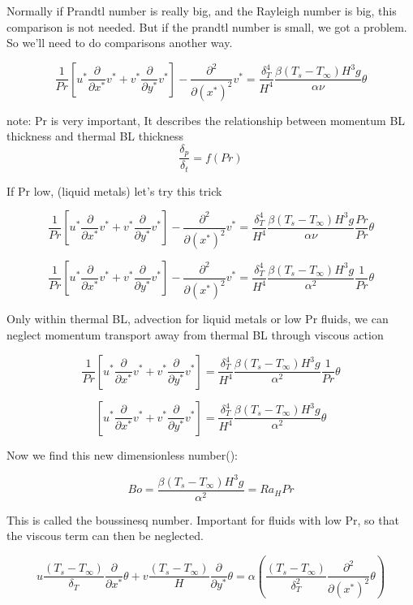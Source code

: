 \documentclass[11pt]{article}
\begin{document}
Normally if Prandtl number is really big, and the Rayleigh number is big, this comparison is not needed. But if the prandtl number is small, we got a problem. So we'll need to do comparisons another way.


$$ \frac{1}{Pr} \left[ u^* \frac{\partial}{\partial x^*} v^* +    v^* \frac{\partial}{\partial y^*} v^* \right] -   \frac{\partial^2}{\partial (x^*)^2} v^*  = \frac{\delta_T^4}{ H^4} \frac{\beta(T_s-T_\infty) H^3 g}{\alpha \nu}  \theta $$


note: Pr is very important,
It describes the relationship between momentum BL thickness and thermal BL thickness
$$\frac{\delta_p}{\delta_t} = f(Pr)$$

If Pr low, (liquid metals)
let's try this trick

$$ \frac{1}{Pr} \left[ u^* \frac{\partial}{\partial x^*} v^* +    v^* \frac{\partial}{\partial y^*} v^* \right] -   \frac{\partial^2}{\partial (x^*)^2} v^*  = \frac{\delta_T^4}{ H^4} \frac{\beta(T_s-T_\infty) H^3 g}{\alpha \nu}  \frac{Pr}{Pr} \theta $$


$$ \frac{1}{Pr} \left[ u^* \frac{\partial}{\partial x^*} v^* +    v^* \frac{\partial}{\partial y^*} v^* \right] -   \frac{\partial^2}{\partial (x^*)^2} v^*  = \frac{\delta_T^4}{ H^4} \frac{\beta(T_s-T_\infty) H^3 g}{\alpha^2}  \frac{1}{Pr} \theta $$

Only within thermal BL, advection for liquid metals or low Pr fluids, we can neglect momentum transport away from thermal BL through viscous action

$$ \frac{1}{Pr} \left[ u^* \frac{\partial}{\partial x^*} v^* +    v^* \frac{\partial}{\partial y^*} v^* \right]  = \frac{\delta_T^4}{ H^4} \frac{\beta(T_s-T_\infty) H^3 g}{\alpha^2}  \frac{1}{Pr} \theta $$

$$ \left[ u^* \frac{\partial}{\partial x^*} v^* +    v^* \frac{\partial}{\partial y^*} v^* \right]  = \frac{\delta_T^4}{ H^4} \frac{\beta(T_s-T_\infty) H^3 g}{\alpha^2}   \theta $$


Now we find this new dimensionless number(\cite{bejan2013convection}):

$$Bo=\frac{\beta(T_s-T_\infty) H^3 g}{\alpha^2}=Ra_H Pr$$

This is called the boussinesq number. Important for fluids with low Pr, so that the viscous term can then be neglected.


$$ u \frac{(T_s - T_\infty)}{\delta_T} \frac{\partial}{\partial x^*}\theta + v \frac{(T_s - T_\infty)}{H} \frac{\partial }{\partial y^*}  \theta  = \alpha ( \frac{(T_s - T_\infty)}{\delta_T^2} \frac{\partial^2}{\partial (x^*)^2} \theta ) $$ 
\end{document}
